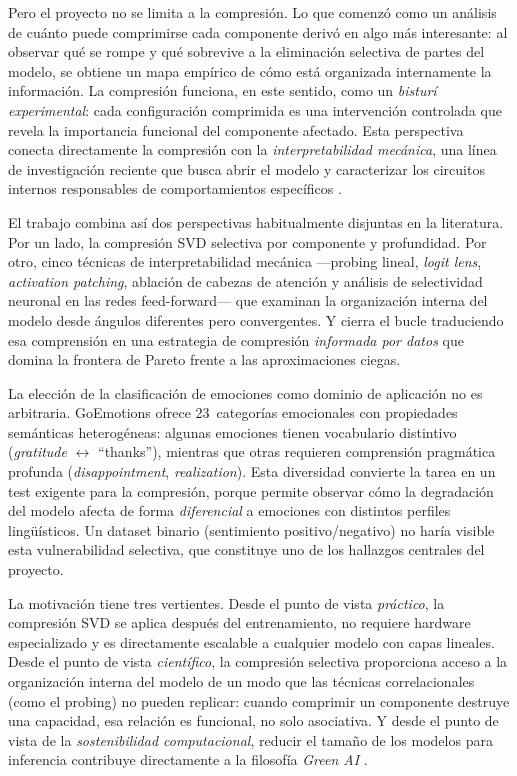 Pero el proyecto no se limita a la compresión. Lo que comenzó como un análisis de
cuánto puede comprimirse cada componente derivó en algo más interesante: al observar
qué se rompe y qué sobrevive a la eliminación selectiva de partes del modelo, se
obtiene un mapa empírico de cómo está organizada internamente la información. La
compresión funciona, en este sentido, como un \emph{bisturí experimental}: cada
configuración comprimida es una intervención controlada que revela la importancia
funcional del componente afectado. Esta perspectiva conecta directamente la
compresión con la \emph{interpretabilidad mecánica}, una línea de investigación
reciente que busca abrir el modelo y caracterizar los circuitos internos
responsables de comportamientos específicos \cite{elhage2021mathematical,
meng2022locating, conmy2023towards}.

El trabajo combina así dos perspectivas habitualmente disjuntas en la literatura.
Por un lado, la compresión SVD selectiva por componente y profundidad. Por otro,
cinco técnicas de interpretabilidad mecánica ---probing lineal, \emph{logit lens},
\emph{activation patching}, ablación de cabezas de atención y análisis de selectividad
neuronal en las redes feed-forward--- que examinan la organización interna del
modelo desde ángulos diferentes pero convergentes. Y cierra el bucle traduciendo
esa comprensión en una estrategia de compresión \emph{informada por datos} que
domina la frontera de Pareto frente a las aproximaciones ciegas.

La elección de la clasificación de emociones como dominio de aplicación no es
arbitraria. GoEmotions \cite{demszky2020goemotions} ofrece 23~categorías
emocionales con propiedades semánticas heterogéneas: algunas emociones tienen
vocabulario distintivo (\emph{gratitude} $\leftrightarrow$ ``thanks''), mientras que
otras requieren comprensión pragmática profunda (\emph{disappointment},
\emph{realization}). Esta diversidad convierte la tarea en un test exigente para la
compresión, porque permite observar cómo la degradación del modelo afecta de forma
\emph{diferencial} a emociones con distintos perfiles lingüísticos. Un dataset
binario (sentimiento positivo/negativo) no haría visible esta vulnerabilidad
selectiva, que constituye uno de los hallazgos centrales del proyecto.

La motivación tiene tres vertientes. Desde el punto de vista \emph{práctico}, la
compresión SVD se aplica después del entrenamiento, no requiere hardware
especializado y es directamente escalable a cualquier modelo con capas lineales.
Desde el punto de vista \emph{científico}, la compresión selectiva proporciona
acceso a la organización interna del modelo de un modo que las técnicas
correlacionales (como el probing) no pueden replicar: cuando comprimir un componente
destruye una capacidad, esa relación es funcional, no solo asociativa. Y desde el
punto de vista de la \emph{sostenibilidad computacional}, reducir el tamaño de los
modelos para inferencia contribuye directamente a la filosofía \textit{Green AI}
\cite{schwartz2020green}.


